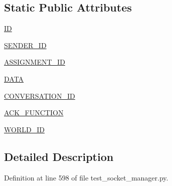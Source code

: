 \subsection*{Static Public Attributes}
\begin{DoxyCompactItemize}
\item 
\hyperlink{classparlai_1_1mturk_1_1core_1_1dev_1_1test_1_1test__socket__manager_1_1TestSocketManagerRoutingFunctionality_a1397badc64bb01d8f0c62fd1bc073712}{ID}
\item 
\hyperlink{classparlai_1_1mturk_1_1core_1_1dev_1_1test_1_1test__socket__manager_1_1TestSocketManagerRoutingFunctionality_a6b63dd840636b2c3ffcd76fe66485edb}{S\+E\+N\+D\+E\+R\+\_\+\+ID}
\item 
\hyperlink{classparlai_1_1mturk_1_1core_1_1dev_1_1test_1_1test__socket__manager_1_1TestSocketManagerRoutingFunctionality_ae9ee9e1c26f6417dab7cdd85eaa78cd9}{A\+S\+S\+I\+G\+N\+M\+E\+N\+T\+\_\+\+ID}
\item 
\hyperlink{classparlai_1_1mturk_1_1core_1_1dev_1_1test_1_1test__socket__manager_1_1TestSocketManagerRoutingFunctionality_ab0470ef4d5aa49fba57399ee5bbbb33b}{D\+A\+TA}
\item 
\hyperlink{classparlai_1_1mturk_1_1core_1_1dev_1_1test_1_1test__socket__manager_1_1TestSocketManagerRoutingFunctionality_aa9619aa70bd5c6694a839c4d2b916772}{C\+O\+N\+V\+E\+R\+S\+A\+T\+I\+O\+N\+\_\+\+ID}
\item 
\hyperlink{classparlai_1_1mturk_1_1core_1_1dev_1_1test_1_1test__socket__manager_1_1TestSocketManagerRoutingFunctionality_ab72904b5a0cc95f2a82ae6ad3420aaad}{A\+C\+K\+\_\+\+F\+U\+N\+C\+T\+I\+ON}
\item 
\hyperlink{classparlai_1_1mturk_1_1core_1_1dev_1_1test_1_1test__socket__manager_1_1TestSocketManagerRoutingFunctionality_abe316a84fa7aa734213cf30e65e5a2c4}{W\+O\+R\+L\+D\+\_\+\+ID}
\end{DoxyCompactItemize}


\subsection{Detailed Description}


Definition at line 598 of file test\+\_\+socket\+\_\+manager.\+py.




